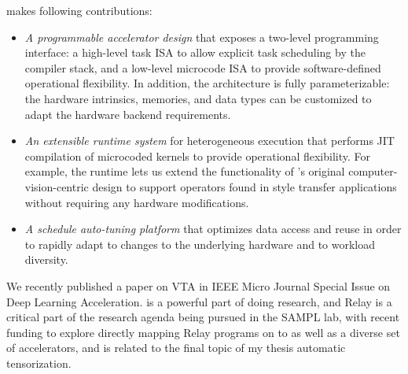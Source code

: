 \vta makes following contributions:

\begin{itemize}
    \item \emph{A programmable accelerator design} that exposes a two-level programming interface: a high-level task ISA to allow explicit task scheduling by the compiler stack, and a low-level microcode ISA to provide software-defined operational flexibility.
    In addition, the \vta architecture is fully parameterizable: the hardware intrinsics, memories, and data types can be customized to adapt the hardware backend requirements.
    \item \emph{An extensible runtime system} for heterogeneous execution that performs JIT compilation of microcoded kernels to provide operational flexibility. For example, the \vta runtime lets us extend the functionality of \vta's original computer-vision-centric design to support operators found in style transfer applications without requiring any hardware modifications.
    \item \emph{A schedule auto-tuning platform} that optimizes data access and reuse in order to rapidly adapt to changes to the underlying hardware and to workload diversity.
\end{itemize}

We recently published a paper on VTA in IEEE Micro Journal Special Issue
  on Deep Learning Acceleration.
\vta is a powerful part of doing research, and Relay is a critical part of the research agenda
  being pursued in the SAMPL lab, with recent funding to explore directly mapping Relay programs
  on to \vta as well as a diverse set of accelerators, and is related to the final topic of my
  thesis automatic tensorization.
